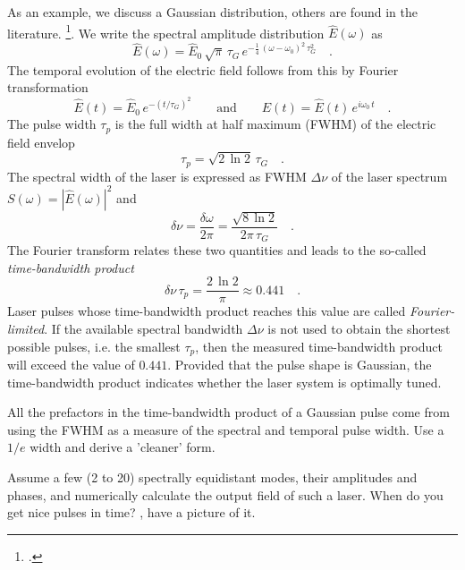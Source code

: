 As an example, we discuss a Gaussian distribution, others are found in the literature. \footcite{DielsRudolph1996,Rulliere2005}.
We write the spectral amplitude distribution $\hat{E}(\omega)$ as
\begin{equation}
  \hat{E}(\omega) = \hat{E}_0 \, \sqrt{\pi} \, \tau_G \, e^{-
  \frac{1}{4} \, (\omega - \omega_0)^2 \, \tau_G^2} \quad .
\end{equation}
The temporal evolution of the electric field follows from this by Fourier transformation
\begin{equation}
  \hat {E}(t) = \hat{E}_0 \, e^{- ( t / \tau_G ) ^2}
  \qquad\text{and}\qquad E(t) = \hat{E}(t)\, e^{i \omega_0 \, t} \quad .
\end{equation}
The pulse width $\tau_p$ is the full width at half maximum (FWHM) of the electric field envelop
\begin{equation}
  \tau_p = \sqrt{2 \, \ln 2} \, \tau_G \quad.
\end{equation}
The spectral width of the laser is expressed as FWHM $\Delta \nu$ of the laser spectrum $S(\omega) =
|\hat{E}(\omega)|^2$ and
\begin{equation}
  \delta \nu = \frac{\delta \omega}{2 \pi} = \frac{\sqrt{8 \, \ln
  2}}{2 \pi \, \tau_G} \quad.
\end{equation}
The Fourier transform relates these two quantities and leads to the so-called \emph{time-bandwidth product}
\begin{equation}
  \delta \nu \, \tau_p = \frac{2 \, \ln 2}{\pi} \approx 0.441 \quad .
\end{equation}
Laser pulses whose time-bandwidth product reaches this value are called \emph{Fourier-limited}. If the available spectral bandwidth $\Delta \nu$ is not used to obtain the shortest possible pulses, i.e. the smallest $\tau_p$, then the measured time-bandwidth product will exceed the value of $0.441$. Provided that the pulse shape is Gaussian, the time-bandwidth product indicates whether the laser system is optimally tuned.

\begin{questions}
  \item All the prefactors in the time-bandwidth product of a Gaussian pulse come from using the FWHM as a measure of the spectral and temporal pulse width. Use a $1/e$ width and derive a 'cleaner' form.

  \item Assume a few (2 to 20) spectrally equidistant modes, their amplitudes and phases, and numerically calculate the output field of such a laser. When do you get nice pulses in time? \cite{DielsRudolph1996}, have a picture of it.

\end{questions}




